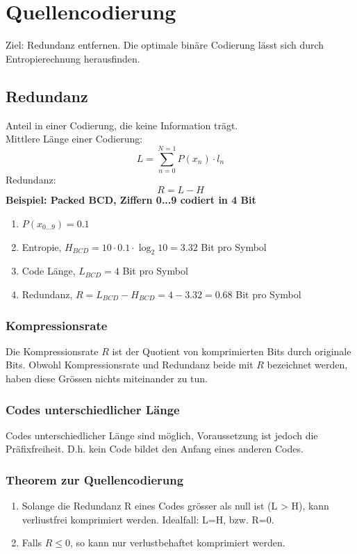\section{Quellencodierung}
Ziel: Redundanz entfernen.
Die optimale binäre Codierung lässt sich durch Entropierechnung herausfinden.
\subsection{Redundanz}
Anteil in einer Codierung, die keine Information trägt. \\
Mittlere Länge einer Codierung:
\[L= \sum_{n=0}^{N=1} P(x_n)\cdot l_n\]
Redundanz:
\[R=L-H\]
\textbf{Beispiel: Packed BCD, Ziffern 0...9 codiert in 4 Bit}
\begin{enumerate}
    \item $P(x_{0...9}) = 0.1$
    \item Entropie, $H_{BCD} = 10 \cdot 0.1 \cdot \log_{2}{10} = 3.32$ Bit pro Symbol
    \item Code Länge, $L_{BCD} = 4$ Bit pro Symbol
    \item Redundanz, $R = L_{BCD} - H_{BCD} = 4 - 3.32 = 0.68$ Bit pro Symbol
\end{enumerate}

\subsubsection{Kompressionsrate}
Die Kompressionsrate $R$ ist der Quotient von komprimierten Bits durch originale Bits. Obwohl Kompressionsrate und Redundanz beide mit $R$ bezeichnet werden, haben diese Grössen nichts miteinander zu tun.

\subsubsection{Codes unterschiedlicher Länge}
Codes unterschiedlicher Länge sind möglich, Voraussetzung ist jedoch die Präfixfreiheit. D.h. kein Code bildet den Anfang eines anderen Codes.

\subsubsection{Theorem zur Quellencodierung}
\begin{enumerate}
    \item Solange die Redundanz R eines Codes grösser als null ist (L > H), kann verliustfrei komprimiert werden. Idealfall: L=H, bzw. R=0.
    \item Falls $R \leq 0$, so kann nur verlustbehaftet komprimiert werden.
\end{enumerate}

